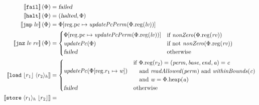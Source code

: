 \documentclass{article}
\newcommand{\update}[2]{[#1 \mapsto #2]}
\newcommand{\sem}[1]{\left\llbracket #1 \right\rrbracket}
\newcommand{\var}[1]{\mathit{#1}}
\newcommand{\rv}{\var{rv}}
\newcommand{\lv}{\var{lv}}
\newcommand{\pcreg}{\mathrm{pc}}
\newcommand{\addr}{\var{a}}
\newcommand{\start}{\var{base}}
\newcommand{\addrend}{\var{end}}
\newcommand{\perm}{\var{perm}}
\newcommand{\plainproj}[1]{\mathrm{#1}}
\newcommand{\memheap}[1][\Phi]{#1.\plainproj{heap}}
\newcommand{\memreg}[1][\Phi]{#1.\plainproj{reg}}
\newcommand{\updateReg}[3][\Phi]{#1\update{\plainproj{reg}.#2}{#3}}
\newcommand{\failed}{\textsl{failed}}
\newcommand{\halted}{\textsl{halted}}
\newcommand{\plainfun}[2]{
  \ifthenelse{\equal{#2}{}}
             {\mathit{#1}}
             {\mathit{#1}(#2)}
}
\newcommand{\updatePcPerm}[1]{\plainfun{updatePcPerm}{#1}}
\newcommand{\nonZero}[1]{\plainfun{nonZero}{#1}}
\newcommand{\readAllowed}[1]{\plainfun{readAllowed}{#1}}
\newcommand{\withinBounds}[1]{\plainfun{withinBounds}{#1}}
\newcommand{\stdUpdatePc}[1]{\plainfun{updatePc}{#1}}
\newcommand{\refreg}[1]{\lfloor #1 \rfloor}
\newcommand{\refheap}[1]{\langle #1 \rangle_h}
\newcommand{\zinstr}[1]{\mathtt{#1}}
\newcommand{\fail}{\zinstr{fail}}
\newcommand{\halt}{\zinstr{halt}}
\newcommand{\oneinstr}[2]{\zinstr{#1} \; #2}
\newcommand{\jmp}[1]{\oneinstr{jmp}{#1}}
\newcommand{\twoinstr}[3]{\zinstr{#1} \; #2 \; #3}
\newcommand{\jnz}[2]{\twoinstr{jnz}{#1}{#2}}
\newcommand{\store}[2]{\twoinstr{store}{#1}{#2}}
\newcommand{\load}[2]{\twoinstr{load}{#1}{#2}}
\begin{document}
\begin{align*}
  \sem{\fail}(\Phi)                        & = \failed \\
  \sem{\halt}(\Phi)                        & = (\halted,\Phi) \\
  \sem{\jmp{\lv}}(\Phi)                    & = \updateReg{\pcreg}{\updatePcPerm{\memreg(\lv)}} \\
  \sem{\jnz{\lv}{\rv}}(\Phi)               & = 
                                             \begin{cases}
                                               \updateReg{\pcreg}{\updatePcPerm{\memreg(\lv)}} &
                                               \arraycolsep=0pt
                                               \begin{array}{l}
                                                 \text{if $\nonZero{\memreg(\rv)}$} 
                                               \end{array}\\
                                               \stdUpdatePc{\Phi} & \text{if not $\nonZero{\memreg(\rv)}$}\\
                                               \failed & \text{otherwise }
                                             \end{cases} \\
 \sem{\load{\refreg{r_1}}{\refheap{r_2}}}  & = 
                                             \begin{cases}
                                               \stdUpdatePc{\updateReg{r_1}{\var{w}}} &
                                               \arraycolsep=0pt
                                               \begin{array}{l}
                                                 \text{if }\memreg(r_2) = (\perm,\start,\addrend,\addr) = \var{c} \\
                                                 \quad\text{and }\readAllowed{\perm} \text{ and } \withinBounds{\var{c}} \\
                                                 \quad\text{and }\var{w} = \memheap(\addr)
                                               \end{array}\\
                                               \failed & \text{otherwise }
                                             \end{cases}\\
 \sem{\store{\refheap{r_1}}{\refreg{r_2}}} & = 

\end{align*}
\end{document}
